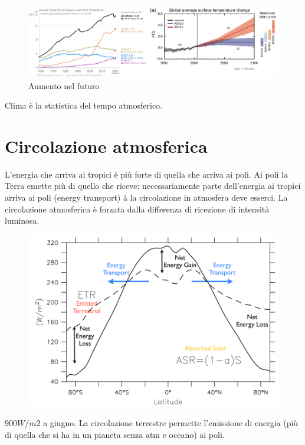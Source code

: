 \begin{figure}
    \centering
    \includegraphics[width=0.85\linewidth]{uploads/aumento nel futuro.png}
    \caption{Aumento nel futuro}
\end{figure}
Clima è la statistica del tempo atmosferico. 

\section{Circolazione atmosferica}
L’energia che arriva ai tropici è più forte di quella che arriva ai poli. Ai poli la Terra emette più di quello che riceve: necessariamente parte dell’energia ai tropici arriva ai poli (energy transport) à la circolazione in atmosfera deve esserci. La circolazione atmosferica è forzata dalla differenza di ricezione di intensità luminosa. 

\begin{figure}[htpb]
    \centering
    \includegraphics[width=0.5\linewidth]{uploads/heat trans.png}
\end{figure}

$900 W/m2$ a giugno.
La circolazione terrestre permette l'emissione di energia (più di quella che si ha in un pianeta senza atm e oceano) ai poli.
